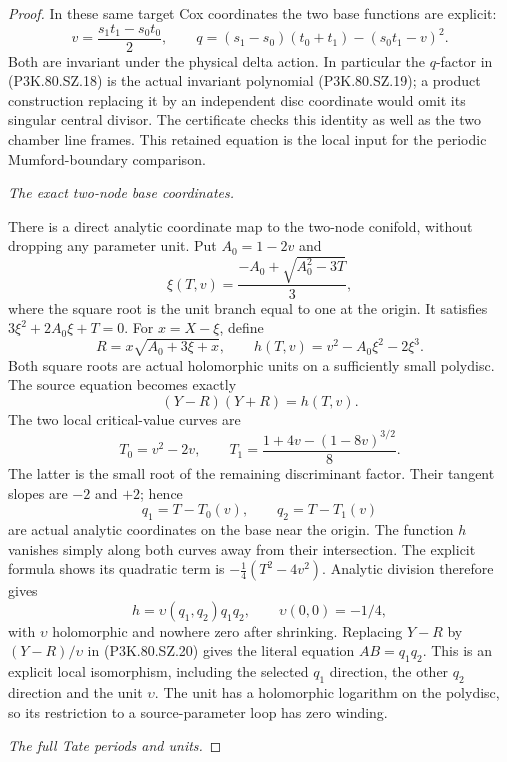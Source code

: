 \begin{proof}
In these same target Cox coordinates the two base functions are
explicit:
\[
 v=\frac{s_1t_1-s_0t_0}{2},\qquad
 q=(s_1-s_0)(t_0+t_1)-(s_0t_1-v)^2.                         \tag{P3K.80.SZ.19}
\]
Both are invariant under the physical delta action. In particular
the \(q\)-factor in (P3K.80.SZ.18) is the actual invariant polynomial
(P3K.80.SZ.19); a product construction replacing it by an independent
disc coordinate would omit its singular central divisor.
The certificate checks this identity as well as the two chamber
line frames. This retained equation is the local input for the
periodic Mumford-boundary comparison.

\par\smallskip\noindent\textit{The exact two-node base coordinates.}\par\nopagebreak[4]

There is a direct analytic coordinate map to the two-node conifold,
without dropping any parameter unit. Put \(A_0=1-2v\) and
\[
 \xi(T,v)=\frac{-A_0+\sqrt{A_0^2-3T}}3 ,
\]
where the square root is the unit branch equal to one at the origin.
It satisfies \(3\xi^2+2A_0\xi+T=0\). For \(x=X-\xi\), define
\[
 R=x\sqrt{A_0+3\xi+x},\qquad
 h(T,v)=v^2-A_0\xi^2-2\xi^3 .
\]
Both square roots are actual holomorphic units on a sufficiently
small polydisc. The source equation becomes exactly
\[
                         (Y-R)(Y+R)=h(T,v).                \tag{P3K.80.SZ.20}
\]
The two local critical-value curves are
\[
 T_0=v^2-2v,\qquad
 T_1=\frac{1+4v-(1-8v)^{3/2}}8 .
\]
The latter is the small root of the remaining discriminant factor.
Their tangent slopes are \(-2\) and \(+2\); hence
\[
                 q_1=T-T_0(v),\qquad q_2=T-T_1(v)
\]
are actual analytic coordinates on the base near the origin.
The function \(h\) vanishes simply along both curves away from their
intersection. The explicit formula shows its quadratic term is
\(-\tfrac14(T^2-4v^2)\). Analytic division therefore gives
\[
                       h=\upsilon(q_1,q_2)q_1q_2,
                         \qquad\upsilon(0,0)=-1/4,          \tag{P3K.80.SZ.21}
\]
with \(\upsilon\) holomorphic and nowhere zero after shrinking.
Replacing \(Y-R\) by \((Y-R)/\upsilon\) in (P3K.80.SZ.20) gives the literal
equation \(AB=q_1q_2\). This is an explicit local isomorphism, including
the selected \(q_1\) direction, the other \(q_2\) direction and the
unit \(\upsilon\). The unit has a holomorphic logarithm on the
polydisc, so its restriction to a source-parameter loop has zero
winding.



\par\smallskip\noindent\textit{The full Tate periods and units.}\par\nopagebreak[4]


\end{proof}
